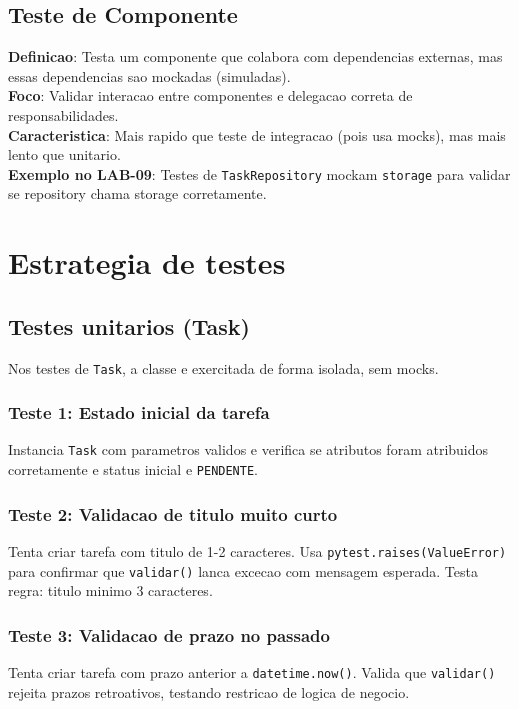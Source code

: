 \documentclass[11pt,a4paper]{article}
\begin{document}
\subsection{Teste de Componente}
\textbf{Definicao}: Testa um componente que colabora com dependencias externas, mas essas dependencias sao mockadas (simuladas). \\
\textbf{Foco}: Validar interacao entre componentes e delegacao correta de responsabilidades. \\
\textbf{Caracteristica}: Mais rapido que teste de integracao (pois usa mocks), mas mais lento que unitario. \\
\textbf{Exemplo no LAB-09}: Testes de \texttt{TaskRepository} mockam \texttt{storage} para validar se repository chama storage corretamente.

\section{Estrategia de testes}

\subsection{Testes unitarios (Task)}
Nos testes de \texttt{Task}, a classe e exercitada de forma isolada, sem mocks.

\subsubsection{Teste 1: Estado inicial da tarefa}
Instancia \texttt{Task} com parametros validos e verifica se atributos foram atribuidos corretamente e status inicial e \texttt{PENDENTE}.

\subsubsection{Teste 2: Validacao de titulo muito curto}
Tenta criar tarefa com titulo de 1-2 caracteres. Usa \texttt{pytest.raises(ValueError)} para confirmar que \texttt{validar()} lanca excecao com mensagem esperada. Testa regra: titulo minimo 3 caracteres.

\subsubsection{Teste 3: Validacao de prazo no passado}
Tenta criar tarefa com prazo anterior a \texttt{datetime.now()}. Valida que \texttt{validar()} rejeita prazos retroativos, testando restricao de logica de negocio.
\end{document}
